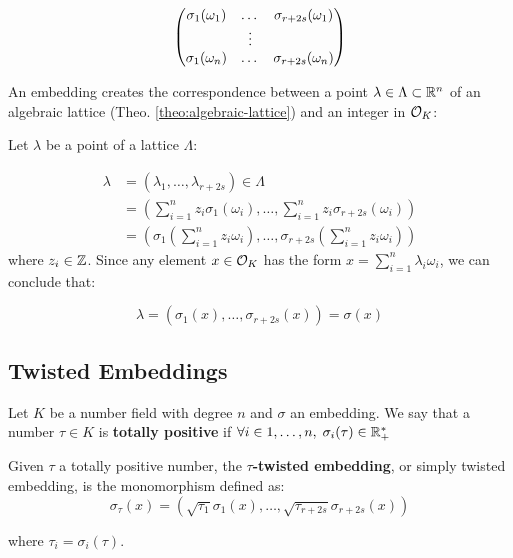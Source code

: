 \documentclass[Ingles]{ic-tese-v3}
\begin{document}
\begin{equation}
  \label{def:gen-matrix-alg-lattices}
  \begin{pmatrix}
    \sigma_1(\omega_1) & $\dots$ &  \sigma_{r+2s}(\omega_1) \\
    & \vdots & \\
    \sigma_1(\omega_n) & $\dots$ & \sigma_{r+2s}(\omega_n) \\
  \end{pmatrix}  
\end{equation}

\begin{remark}\label{rem:lat-int-correspondence}
  An embedding creates the correspondence between a point $\lambda \in \Lambda \subset \mathbb{R}^n$ of an algebraic lattice (Theo.
  \ref{theo:algebraic-lattice}) and an integer in $\mathcal{O}_K$:

  Let $\lambda$ be a point of a lattice $\Lambda$:

\begin{align*} 
     \lambda &= (\lambda_1,\dots,\lambda_{r+2s}) \in \Lambda \\
       &= \left( \sum_{i=1}^n{z_i\sigma_1(\omega_i)} , \dots , \sum_{i=1}^n{z_i\sigma_{r+2s}(\omega_i)} \right) \\
       &= \left( \sigma_1\left(   \sum_{i=1}^n{z_i\omega_i} \right) , \dots , \sigma_{r+2s} \left( \sum_{i=1}^n{z_i\omega_i}  \right) \right) 
\end{align*}
  where $z_i \in \mathbb{Z}$. Since any element $x \in \mathcal{O}_K$ has the form $x =
  \sum_{i=1}^n{\lambda_i\omega_i}$, we can conclude that:

  \begin{equation*}
    \lambda = \left( \sigma_1(x), \dots, \sigma_{r+2s}(x) \right) = \sigma(x)
  \end{equation*}

\end{remark}

\subsection{Twisted Embeddings}
\label{sec:org37e4392}

\begin{definition}
Let $K$ be a number field with degree $n$ and $\sigma$ an embedding. We say that a number $\tau \in K$ is
\textbf{totally  positive} if $\forall i \in {1, \dots , n}, \; \sigma_i(\tau) \in \mathbb{R}^*_+$ 
\end{definition}


\begin{definition}
  \label{def:twisted-emb}
  Given $\tau$ a totally positive number, the \textbf{$\tau$-twisted embedding}, or
  simply twisted embedding, is the monomorphism defined as:
  \begin{equation*}
    \sigma_\tau(x) = \left( \sqrt{\tau_1}\sigma_1(x), \dots, \sqrt{\tau_{r+2s}}\sigma_{r+2s}(x) \right)
  \end{equation*}

  where $\tau_i = \sigma_i(\tau)$.
\end{definition}
\end{document}

